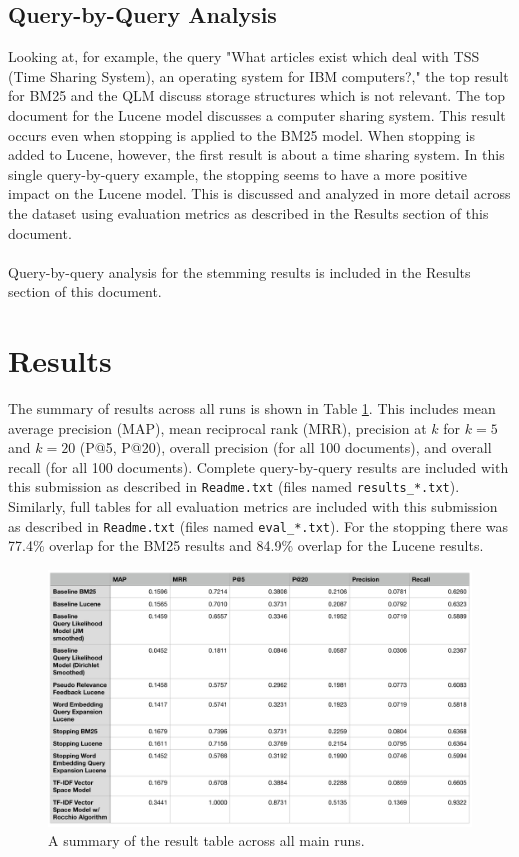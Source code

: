 \documentclass[conference]{IEEEtran}
\begin{document}
\subsection{Query-by-Query Analysis}
Looking at, for example, the query "What articles exist which deal with TSS (Time Sharing System), an operating system for IBM computers?," the top result for BM25 and the QLM discuss storage structures which is not relevant.  The top document for the Lucene model discusses a computer sharing system. This result occurs even when stopping is applied to the BM25 model. When stopping is added to Lucene, however, the first result is about a time sharing system. In this single query-by-query example, the stopping seems to have a more positive impact on the Lucene model. This is discussed and analyzed in more detail across the dataset using evaluation metrics as described in the Results section of this document.
\\\\
Query-by-query analysis for the stemming results is included in the Results section of this document.

\section{Results}
The summary of results across all runs is shown in Table \ref{fig:results}. This includes mean average precision (MAP), mean reciprocal rank (MRR), precision at $k$ for $k=5$ and $k=20$ (P@5, P@20), overall precision (for all 100 documents), and overall recall (for all 100 documents). Complete query-by-query results are included with this submission as described in \verb|Readme.txt| (files named \verb|results_*.txt|). Similarly, full tables for all evaluation metrics are included with this submission as described in \verb|Readme.txt| (files named \verb|eval_*.txt|). For the stopping there was 77.4\% overlap for the BM25 results and 84.9\% overlap for the Lucene results.

\begin{figure}
  \includegraphics[width=\textwidth]{results_summary_table}
  \caption{A summary of the result table across all main runs.}
  \label{fig:results}
\end{figure}
\end{document}
